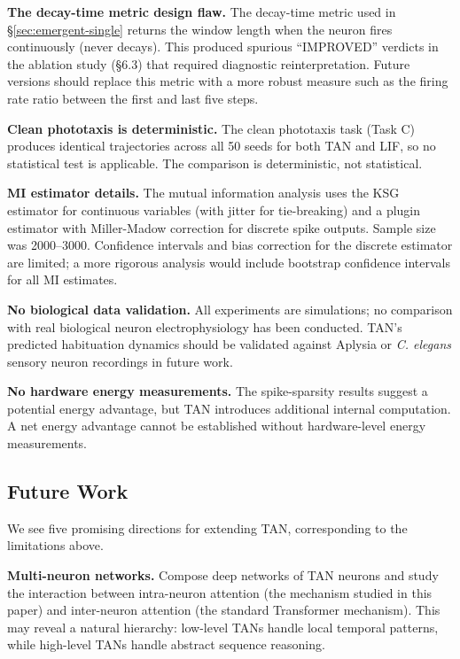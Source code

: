 \textbf{The decay-time metric design flaw.} The decay-time metric used in \S\ref{sec:emergent-single} returns the window length when the neuron fires continuously (never decays). This produced spurious ``IMPROVED'' verdicts in the ablation study (\S6.3) that required diagnostic reinterpretation. Future versions should replace this metric with a more robust measure such as the firing rate ratio between the first and last five steps.

\textbf{Clean phototaxis is deterministic.} The clean phototaxis task (Task C) produces identical trajectories across all 50 seeds for both TAN and LIF, so no statistical test is applicable. The comparison is deterministic, not statistical.

\textbf{MI estimator details.} The mutual information analysis uses the KSG estimator for continuous variables (with jitter for tie-breaking) and a plugin estimator with Miller-Madow correction for discrete spike outputs. Sample size was 2000--3000. Confidence intervals and bias correction for the discrete estimator are limited; a more rigorous analysis would include bootstrap confidence intervals for all MI estimates.

\textbf{No biological data validation.} All experiments are simulations; no comparison with real biological neuron electrophysiology has been conducted. TAN's predicted habituation dynamics should be validated against Aplysia or \textit{C. elegans} sensory neuron recordings in future work.

\textbf{No hardware energy measurements.} The spike-sparsity results suggest a potential energy advantage, but TAN introduces additional internal computation. A net energy advantage cannot be established without hardware-level energy measurements.

\subsection{Future Work}

We see five promising directions for extending TAN, corresponding to the limitations above.

\textbf{Multi-neuron networks.} Compose deep networks of TAN neurons and study the interaction between intra-neuron attention (the mechanism studied in this paper) and inter-neuron attention (the standard Transformer mechanism). This may reveal a natural hierarchy: low-level TANs handle local temporal patterns, while high-level TANs handle abstract sequence reasoning.

